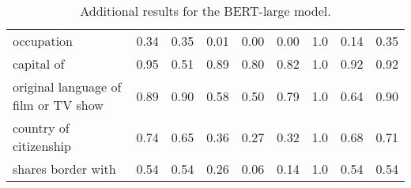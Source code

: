 \begin{table*}[t]
{\begin{tabular}{lrrrrrrrr}
                           occupation &                      0.34 &                        0.35 &      0.01 &            0.00 &                 0.00 &                  1.0 &                 0.14 &         0.35 \\
                           capital of &                      0.95 &                        0.51 &      0.89 &            0.80 &                 0.82 &                  1.0 &                 0.92 &         0.92 \\
 original language of film or TV show &                      0.89 &                        0.90 &      0.58 &            0.50 &                 0.79 &                  1.0 &                 0.64 &         0.90 \\
               country of citizenship &                      0.74 &                        0.65 &      0.36 &            0.27 &                 0.32 &                  1.0 &                 0.68 &         0.71 \\
                   shares border with &                      0.54 &                        0.54 &      0.26 &            0.06 &                 0.14 &                  1.0 &                 0.54 &         0.54 \\
\bottomrule
\end{tabular}
}
    \caption{Additional results for the BERT-large model. }
    \label{tab:bert-results}
\end{table*}
